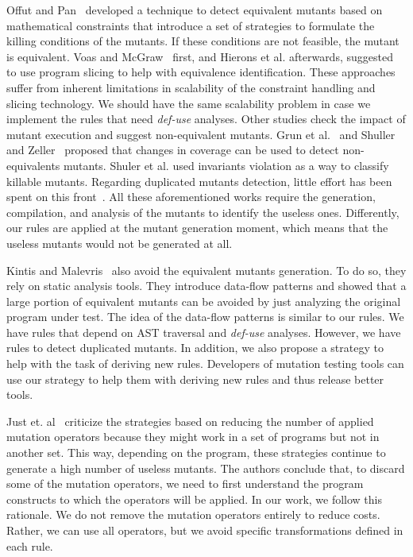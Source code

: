 Offut and Pan~\cite{OFFUT:1996:1, OFFUT:1997:1} developed a technique to detect equivalent mutants based on mathematical constraints that introduce a set of strategies to formulate the killing conditions of the mutants. If these conditions are not feasible, the mutant is equivalent. Voas and McGraw~\cite{VOAS:1997:1} first, and Hierons et al. \cite{HIERONS:1999:1} afterwards, suggested to use program slicing to help with equivalence identification. These approaches suffer from inherent limitations in scalability of the constraint handling and slicing technology. We should have the same scalability problem in case we implement the rules that need \textit{def-use} analyses. Other studies check the impact of mutant execution and suggest non-equivalent mutants. Grun et al.~\cite{GRUN:2009:1} and Shuller and Zeller~\cite{SHULER:2010:1, SHULER:2013:1} proposed that changes in coverage can be used to detect non-equivalents mutants. Shuler et al. \cite{SHULER:2009:1} used invariants violation as a way to classify killable mutants. Regarding duplicated mutants detection, little effort has been spent on this front~\cite{PAPADAKIS:2015:1, KINTIS:2017:1}. All these aforementioned works require the generation, compilation, and analysis of the mutants to identify the useless ones. Differently, our rules are applied at the mutant generation moment, which means that the useless mutants would not be generated at all.

Kintis and Malevris~\cite{KINTIS:2015:1} also avoid the equivalent mutants generation. To do so, they rely on static analysis tools. They introduce data-flow patterns and showed that a large portion of equivalent mutants can be avoided by just analyzing the original program under test. The idea of the data-flow patterns is similar to our rules. We have rules that depend on AST traversal and \textit{def-use} analyses. However, we have rules to detect duplicated mutants. In addition, we also propose a strategy to help with the task of deriving new rules. Developers of mutation testing tools can use our strategy to help them with deriving new rules and thus release better tools.

Just et. al~\cite{JUST:2017:1} criticize the strategies based on reducing the number of applied mutation operators because they might work in a set of programs but not in another set. This way, depending on the program, these strategies continue to generate a high number of useless mutants. The authors conclude that, to discard some of the mutation operators, we need to first understand the program constructs to which the operators will be applied. In our work, we follow this rationale. We do not remove the mutation operators entirely to reduce costs. Rather, we can use all operators, but we avoid specific transformations defined in each rule.


